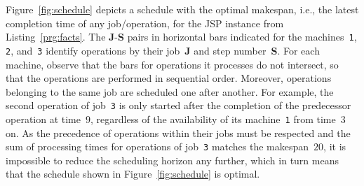 \documentclass{tlp} %
\begin{document}


Figure~\ref{fig:schedule} depicts a schedule with the optimal makespan, i.e., the latest completion time of any job/operation, for the JSP instance from Listing~\ref{prg:facts}.
The \textbf{J}-\textbf{S} pairs in horizontal bars indicated for the
machines~\lstinline{1}, \lstinline{2}, and~\lstinline{3} identify operations
by their job~\textbf{J} and step number~\textbf{S}.
For each machine, observe that the bars for operations it processes do not
intersect, so that the operations are performed in sequential order.
Moreover, operations belonging to the same job are scheduled one after another.
For example,
the second operation of job~\lstinline{3} is only started after the
completion of the predecessor operation at time~$9$,
regardless of the availability of its machine~\lstinline{1}
from time~$3$ on.
As the precedence of operations within their jobs must be respected
and the sum of processing times for operations of job~\lstinline{3}
matches the makespan~$20$, it is impossible to reduce the scheduling
horizon any further,
which in turn means that the schedule shown in Figure~\ref{fig:schedule} is optimal.
%
\end{document}
